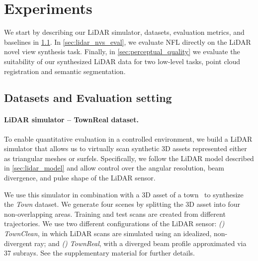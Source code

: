 












\section{Experiments}
\label{sec:results}
We start by describing our LiDAR simulator,  datasets, evaluation metrics, and baselines in \cref{sec:dataset}. In \cref{sec:lidar_nvs_eval}, we evaluate NFL directly on the LiDAR novel view synthesis task. Finally, in \cref{sec:perceptual_quality} we evaluate the suitability of our synthesized LiDAR data for two low-level tasks, point cloud registration and semantic segmentation.




\subsection{Datasets and Evaluation setting}
\label{sec:dataset}
\paragraph{LiDAR simulator -- TownReal dataset.} 
To enable quantitative evaluation in a controlled environment, we build a LiDAR simulator that allows us to virtually scan synthetic 3D assets represented either as triangular meshes or surfels. Specifically, we follow the LiDAR model described in \cref{sec:lidar_model} and allow control over the angular resolution, beam divergence, and pulse shape of the LiDAR sensor.  %

We use this simulator in combination with a 3D asset of a town~\cite{turbosquid} to synthesize the \emph{Town} dataset. We generate four scenes by splitting the 3D asset into four non-overlapping areas. Training and test scans %
are created from different trajectories.  We use two different configurations of the LiDAR sensor: \textit{()} \textit{TownClean}, in which LiDAR scans are simulated using an idealized, non-divergent ray; and \textit{()} \textit{TownReal}, with a diverged beam profile approximated via 37 subrays. See the supplementary material for further details.



